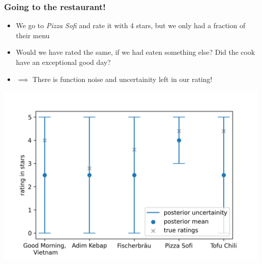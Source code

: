 \begin{frame}[c]
    \frametitle{Going to the restaurant!}
    \begin{itemize}
        \item We go to \emph{Pizza Sofi} and rate it with 4 stars, but we only had a fraction of their menu
        \item Would we have rated the same, if we had eaten something else? Did the cook have an exceptional good day?
        \item[] $\implies$ There is function noise and uncertainity left in our rating!
    \end{itemize}
    \vspace{-.5cm}
    \begin{center}
        \includegraphics[scale=0.5]{imgs/restaurantsposterior.png}
    \end{center}
\end{frame}

